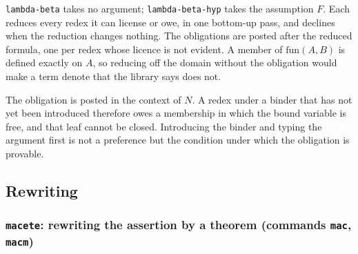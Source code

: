 \texttt{lambda-beta} takes no argument; \texttt{lambda-beta-hyp} takes
the assumption $F$.  Each reduces every redex it can license or owe, in
one bottom-up pass, and declines when the reduction changes nothing.
The obligations are posted after the reduced formula, one per redex
whose licence is not evident.  A member of $\mathrm{fun}(A, B)$ is
defined exactly on $A$, so reducing off the domain without the
obligation would make a term denote that the library says does not.

\begin{remark}
The obligation is posted in the context of $N$.  A redex under a binder
that has not yet been introduced therefore owes a membership in which the
bound variable is free, and that leaf cannot be closed.  Introducing the
binder and typing the argument first is not a preference but the
condition under which the obligation is provable.
\end{remark}

\subsection{Rewriting}

\subsubsection*{\texttt{macete}: rewriting the assertion by a theorem
  (commands \texttt{mac}, \texttt{macm})}

